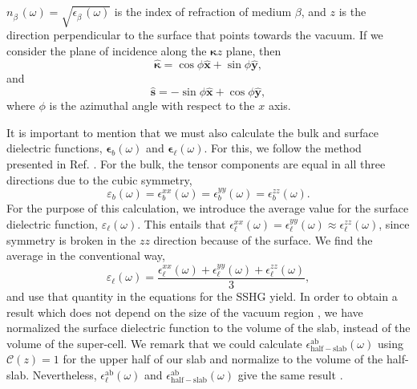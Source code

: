 $n^{\phantom{A}}_{\beta}(\omega)=\sqrt{\epsilon^{\phantom{A}}_{\beta}(\omega)}$
is the index of refraction of medium $\beta$, and $z$ is the direction
perpendicular to the surface that points towards the vacuum. If we consider the
plane of incidence along the $\boldsymbol{\kappa}z$ plane, then
\begin{equation}\label{eq:mc1}
\hat{\boldsymbol{\kappa}} = \cos\phi\hat{\mathbf{x}} + \sin\phi\hat{\mathbf{y}},
\end{equation}
and
\begin{equation}\label{eq:mmc2}
\hat{\mathbf{s}} = -\sin\phi\hat{\mathbf{x}} + \cos\phi\hat{\mathbf{y}},
\end{equation}
where $\phi$ is the azimuthal angle with respect to the $x$ axis.

{\color{red}
It is important to mention that we must also calculate the bulk and surface
dielectric functions, $\boldsymbol{\epsilon}_b(\omega)$ and
$\boldsymbol{\epsilon}_\ell(\omega)$. For this, we follow the method presented
in Ref. \cite{mendozaPRB06}. For the bulk, the tensor components are equal in
all three directions due to the cubic symmetry,
\begin{equation*}
\varepsilon_{b}(\omega) = 
\epsilon^{xx}_{b}(\omega) = 
\epsilon^{yy}_{b}(\omega) = 
\epsilon^{zz}_{b}(\omega).
\end{equation*}
For the purpose of this calculation, we introduce the average value for the
surface dielectric function, $\varepsilon_\ell(\omega)$. This entails that
$\epsilon^{xx}_{\ell}(\omega) = \epsilon^{yy}_{\ell}(\omega) \approx
\epsilon^{zz}_{\ell}(\omega)$, since symmetry is broken in the $zz$ direction
because of the surface. We find the average in the conventional way,
\begin{equation*}
\varepsilon_{\ell}(\omega) = 
\frac{\epsilon^{xx}_{\ell}(\omega) + 
\epsilon^{yy}_{\ell}(\omega) + 
\epsilon^{zz}_{\ell}(\omega)}{3},
\end{equation*}
and use that quantity in the equations for the SSHG yield. In order to obtain a
result which does not depend on the size of the vacuum region
\cite{nicolasPRB15}, we have normalized the surface dielectric function to the
volume of the slab, instead of the volume of the super-cell. We remark that we
could calculate $\epsilon^{\mathrm{ab}}_{\mathrm{half-slab}}(\omega)$ using
${\mathcal{C}}(z)=1$ for the upper half of our slab and normalize to the volume
of the half-slab. Nevertheless, $\epsilon^{\mathrm{ab}}_{\ell}(\omega)$ and
$\epsilon^{\mathrm{ab}}_{\mathrm{half-slab}}(\omega)$ give the same
result \cite{hoganPRB03, castilloPRB03, nicolasPRB15}.}

